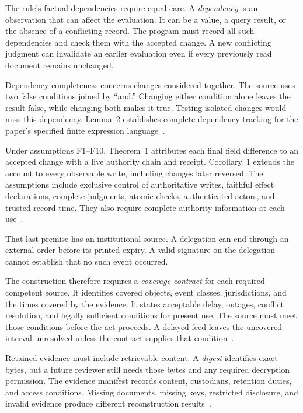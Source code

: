 \documentclass{momentum}
\begin{document}
The rule's factual dependencies require equal care.
A \emph{dependency} is an observation that can affect the evaluation.
It can be a value, a query result, or the absence of a conflicting record.
The program must record all such dependencies and check them with the accepted change.
A new conflicting judgment can invalidate an earlier evaluation even if every previously read document remains unchanged.

Dependency completeness concerns changes considered together.
The source uses two false conditions joined by ``and.''
Changing either condition alone leaves the result false, while changing both makes it true.
Testing isolated changes would miss this dependency.
Lemma~2 establishes complete dependency tracking for the paper's specified finite expression language~\cite[Section~3.2]{institutions}.

Under assumptions F1--F10, Theorem~1 attributes each final field difference to an accepted change with a live authority chain and receipt.
Corollary~1 extends the account to every observable write, including changes later reversed.
The assumptions include exclusive control of authoritative writes, faithful effect declarations, complete judgments, atomic checks, authenticated actors, and trusted record time.
They also require complete authority information at each use~\cite[Section~4]{institutions}.

That last premise has an institutional source.
A delegation can end through an external order before its printed expiry.
A valid signature on the delegation cannot establish that no such event occurred.

The construction therefore requires a \emph{coverage contract} for each required competent source.
It identifies covered objects, event classes, jurisdictions, and the times covered by the evidence.
It states acceptable delay, outages, conflict resolution, and legally sufficient conditions for present use.
The source must meet those conditions before the act proceeds.
A delayed feed leaves the uncovered interval unresolved unless the contract supplies that condition~\cite[Section~6.1]{institutions}.

Retained evidence must include retrievable content.
A \emph{digest} identifies exact bytes, but a future reviewer still needs those bytes and any required decryption permission.
The evidence manifest records content, custodians, retention duties, and access conditions.
Missing documents, missing keys, restricted disclosure, and invalid evidence produce different reconstruction results~\cite[Section~6.2]{institutions}.
\end{document}
